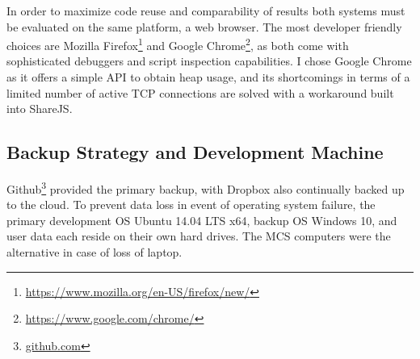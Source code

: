 \documentclass[12pt,a4paper,twoside,openright]{report}
\begin{document}
	In order to maximize code reuse and comparability of results both systems must be evaluated on the same platform, a web browser. The most developer friendly choices are Mozilla Firefox\footnote{\url{https://www.mozilla.org/en-US/firefox/new/}} and Google Chrome\footnote{\url{https://www.google.com/chrome/}}, as both come with sophisticated debuggers and script inspection capabilities. I chose Google Chrome as it offers a simple API to obtain heap usage, and its shortcomings in terms of a limited number of active TCP connections are solved with a workaround built into ShareJS.
	

	
	
	
	
	
	\subsection{Backup Strategy and Development Machine}
	Github\footnote{\url{github.com}} provided the primary backup, with Dropbox also continually backed up to the cloud. To prevent data loss in event of operating system failure, the primary development OS Ubuntu 14.04 LTS x64, backup OS Windows 10, and user data each reside on their own hard drives. The MCS computers were the alternative in case of loss of laptop.
	
\end{document}
